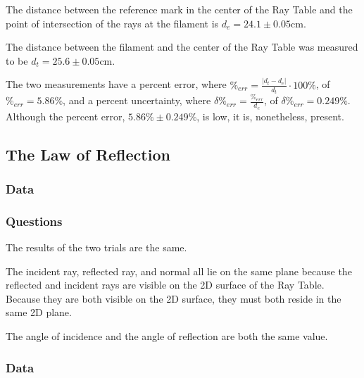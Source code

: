 \documentclass[12pt]{article}
\begin{document}
\subsubsubsection{}

The distance between the reference mark in the center of the Ray Table and the
point of intersection of the rays at the filament
is \(d_e = 24.1 \pm 0.05 \si{\centi\meter}\).

\subsubsubsection{}

The distance between the filament and the center of the Ray Table was measured
to be \(d_t = 25.6 \pm 0.05 \si{\centi\meter}\).

\subsubsubsection{}

The two measurements have a percent error, where
\(\%_{err} = \frac{|d_t - d_e|}{d_t} \cdot 100\%\), of \(\%_{err} = 5.86\%\), and a percent
uncertainty, where \(\delta \%_{err} = \frac{\%_{err}}{d_e}\), of \(\delta
\%_{err} = 0.249 \%\). Although the percent error, \(5.86\% \pm 0.249\%\), is low,
it is, nonetheless, present.



\subsection{The Law of Reflection}

\subsubsection{Data}



\subsubsection{Questions}

\subsubsubsection{}

The results of the two trials are the same.

\subsubsubsection{}

The incident ray, reflected ray, and normal all lie on the same plane because
the reflected and incident rays are visible on the 2D surface of the Ray
Table. Because they are both visible on the 2D surface, they must both reside in
the same 2D plane.

\subsubsubsection{}

The angle of incidence and the angle of reflection are both the same value. 

\subsubsection{Data}
\end{document}
